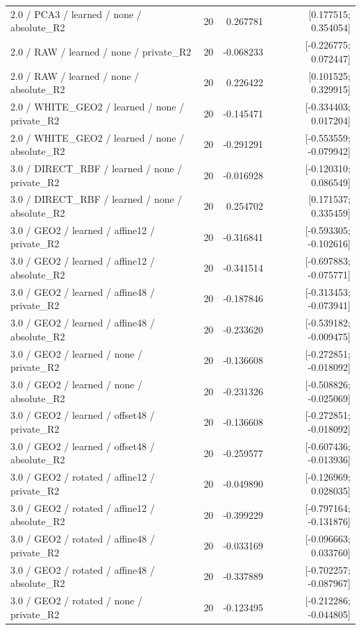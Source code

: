 \begin{longtable}{p{.56\linewidth}rrr}
2.0 / PCA3 / learned / none / absolute\_R2 & 20 & 0.267781 & [0.177515; 0.354054] \\
2.0 / RAW / learned / none / private\_R2 & 20 & -0.068233 & [-0.226775; 0.072447] \\
2.0 / RAW / learned / none / absolute\_R2 & 20 & 0.226422 & [0.101525; 0.329915] \\
2.0 / WHITE\_GEO2 / learned / none / private\_R2 & 20 & -0.145471 & [-0.334403; 0.017204] \\
2.0 / WHITE\_GEO2 / learned / none / absolute\_R2 & 20 & -0.291291 & [-0.553559; -0.079942] \\
3.0 / DIRECT\_RBF / learned / none / private\_R2 & 20 & -0.016928 & [-0.120310; 0.086549] \\
3.0 / DIRECT\_RBF / learned / none / absolute\_R2 & 20 & 0.254702 & [0.171537; 0.335459] \\
3.0 / GEO2 / learned / affine12 / private\_R2 & 20 & -0.316841 & [-0.593305; -0.102616] \\
3.0 / GEO2 / learned / affine12 / absolute\_R2 & 20 & -0.341514 & [-0.697883; -0.075771] \\
3.0 / GEO2 / learned / affine48 / private\_R2 & 20 & -0.187846 & [-0.313453; -0.073941] \\
3.0 / GEO2 / learned / affine48 / absolute\_R2 & 20 & -0.233620 & [-0.539182; -0.009475] \\
3.0 / GEO2 / learned / none / private\_R2 & 20 & -0.136608 & [-0.272851; -0.018092] \\
3.0 / GEO2 / learned / none / absolute\_R2 & 20 & -0.231326 & [-0.508826; -0.025069] \\
3.0 / GEO2 / learned / offset48 / private\_R2 & 20 & -0.136608 & [-0.272851; -0.018092] \\
3.0 / GEO2 / learned / offset48 / absolute\_R2 & 20 & -0.259577 & [-0.607436; -0.013936] \\
3.0 / GEO2 / rotated / affine12 / private\_R2 & 20 & -0.049890 & [-0.126969; 0.028035] \\
3.0 / GEO2 / rotated / affine12 / absolute\_R2 & 20 & -0.399229 & [-0.797164; -0.131876] \\
3.0 / GEO2 / rotated / affine48 / private\_R2 & 20 & -0.033169 & [-0.096663; 0.033760] \\
3.0 / GEO2 / rotated / affine48 / absolute\_R2 & 20 & -0.337889 & [-0.702257; -0.087967] \\
3.0 / GEO2 / rotated / none / private\_R2 & 20 & -0.123495 & [-0.212286; -0.044805] \\

\end{longtable}
